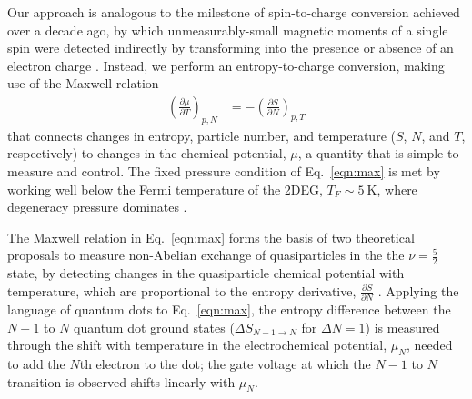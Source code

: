 \documentclass[twocolumn,showpacs,amsmath,amssymb,prl,aps,superscriptaddress]{revtex4-1}
\begin{document}
Our approach is analogous to the milestone of spin-to-charge conversion achieved over a decade ago, by which unmeasurably-small magnetic moments of a single spin were detected indirectly by transforming into the presence or absence of an electron charge \cite{Elzerman2004, Ono2004}.  Instead, we perform an entropy-to-charge conversion, making use of the Maxwell relation
%
\begin{align}
\label{eqn:max}
        \left(\frac{\partial \mu}{\partial T}\right)_{p,N} &= -\left(\frac{\partial S}{\partial N}\right)_{p,T}
\end{align}
%
that connects changes in entropy, particle number, and temperature ($S$, $N$, and $T$, respectively) to changes in the chemical potential, $\mu$, a quantity that is simple to measure and control. The fixed pressure condition of Eq.~\ref{eqn:max} is met by working well below the Fermi temperature of the 2DEG, $T_F \sim \SI{5}{\kelvin}$, where degeneracy pressure dominates \cite{Landau1969}.

The Maxwell relation in Eq.~\ref{eqn:max} forms the basis of two theoretical proposals to measure non-Abelian exchange of quasiparticles in the the $\nu = \frac{5}{2}$ state, by detecting changes in the quasiparticle chemical potential with temperature, which are proportional to the entropy derivative, $\frac{\partial S}{\partial N}$ \cite{Cooper2009,Ben-Shach2013}.
Applying the language of quantum dots to Eq.~\ref{eqn:max}, the entropy difference between the $N-1$ to $N$ quantum dot ground states ($\Delta S_{N-1\rightarrow N}$ for $\Delta N=1$) is measured through the shift with temperature in the electrochemical potential, $\mu_N$, needed to add the $N$th electron to the dot; the gate voltage at which the $N-1$ to $N$ transition is observed shifts linearly with $\mu_{N}$.
\end{document}
